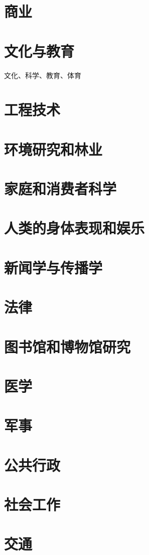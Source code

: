 \documentclass[UTF8]{ApplicationUniverse}
\begin{document}
\chapter{商业}

\chapter{文化与教育}

文化、科学、教育、体育

\chapter{工程技术}

\chapter{环境研究和林业}

\chapter{家庭和消费者科学}

\chapter{人类的身体表现和娱乐}


\chapter{新闻学与传播学}

\chapter{法律}

\chapter{图书馆和博物馆研究}




\chapter{医学}

\chapter{军事}

\chapter{公共行政}

\chapter{社会工作}

\chapter{交通}
\end{document}
